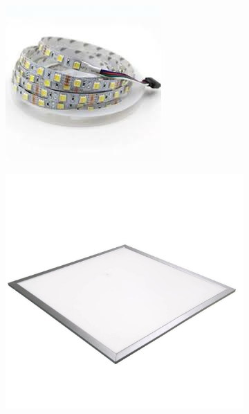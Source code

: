 \documentclass[fleqn,twoside,12pt]{report}
\begin{document}
\begin{figure}[h]
	\centering
	\begin{subfigure}{.5\textwidth}
		\centering
		\includegraphics[width=.7\linewidth]{strip_LED.jpg}
		\caption{}
		\label{fig:strip_LED}
	\end{subfigure}%
	\begin{subfigure}{.5\textwidth}
		\centering
		\includegraphics[width=0.7\linewidth]{panel_LED.jpg}
		\caption{}
		\label{fig:panel_LED}
	\end{subfigure}%


\end{figure}
\end{document}
